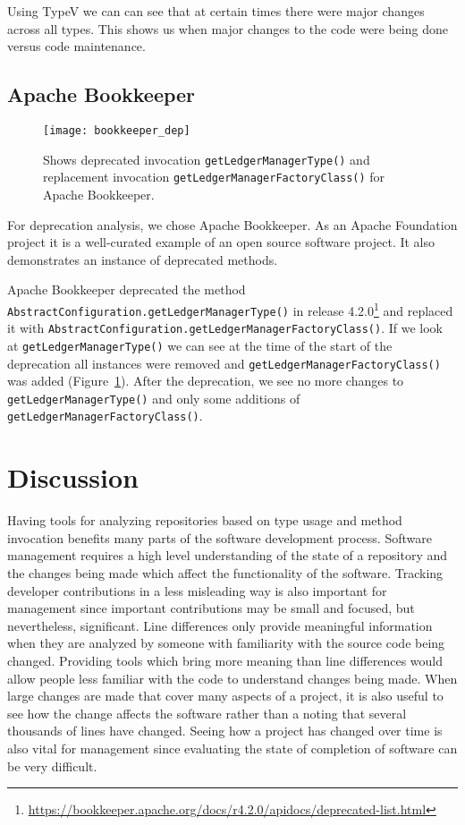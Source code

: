 Using TypeV we can can see that at certain times there were major changes across all types. This shows us when major changes to the code were being done versus code maintenance. 

\subsection{Apache Bookkeeper}

\begin{figure}[!ht]
\centering
\texttt{[image: bookkeeper\_dep]}
\caption{Shows deprecated invocation \texttt{getLedgerManagerType()} and replacement invocation \texttt{getLedgerManagerFactoryClass()} for Apache Bookkeeper.}
\label{fig:bookkeeper-depr}
\end{figure}

For deprecation analysis, we chose Apache Bookkeeper. As an Apache Foundation project it is a well-curated example of an open source software project. It also demonstrates an instance of deprecated methods. 

Apache Bookkeeper deprecated the method \texttt{AbstractConfiguration.getLedgerManagerType()} in release 4.2.0\footnote{\url{https://bookkeeper.apache.org/docs/r4.2.0/apidocs/deprecated-list.html}} and replaced it with \texttt{AbstractConfiguration.getLedgerManagerFactoryClass()}. If we look at \texttt{getLedgerManagerType()} we can see at the time of the start of the deprecation all instances were removed and \texttt{getLedgerManagerFactoryClass()} was added (Figure~\ref{fig:bookkeeper-depr}). After the deprecation, we see no more changes to \texttt{getLedgerManagerType()} and only some additions of \texttt{getLedgerManagerFactoryClass()}.


\section{Discussion}

Having tools for analyzing repositories based on type usage and method invocation benefits many parts of the software development process. Software management requires a high level understanding of the state of a repository and the changes being made which affect the functionality of the software. Tracking developer contributions in a less misleading way is also important for management since important contributions may be small and focused, but nevertheless, significant. Line differences only provide meaningful information when they are analyzed by someone with familiarity with the source code being changed. Providing tools which bring more meaning than line differences would allow people less familiar with the code to understand changes being made. When large changes are made that cover many aspects of a project, it is also useful to see how the change affects the software rather than a noting that several thousands of lines have changed. Seeing how a project has changed over time is also vital for management since evaluating the state of completion of software can be very difficult.

